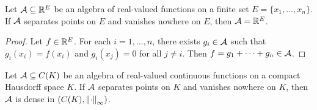 \begin{theorem}
    Let $\mathcal{A} \subseteq \mathbb{R}^{E}$ be an algebra of real-valued functions on a finite set $E = \{x_{1},\ldots,x_{n}\}$. If $\mathcal{A}$ separates points on $E$ and vanishes nowhere on $E$, then $\mathcal{A} = \mathbb{R}^{E}$.
\end{theorem}
\begin{proof}
    Let $f \in \mathbb{R}^{E}$. For each $i = 1,\ldots,n$, there exists $g_{i} \in \mathcal{A}$ such that $g_{i}(x_{i}) = f(x_{i})$ and $g_{i}(x_{j}) = 0$ for all $j \neq i$. Then $f = g_{1} + \cdots + g_{n} \in \mathcal{A}$.
\end{proof}

\begin{theorem}
    Let $\mathcal{A} \subseteq C(K)$ be an algebra of real-valued continuous functions on a compact Hausdorff space $K$. If $\mathcal{A}$ separates points on $K$ and vanishes nowhere on $K$, then $\mathcal{A}$ is dense in $(C(K),\left\lVert\cdot\right\rVert_{\infty})$.
\end{theorem}
